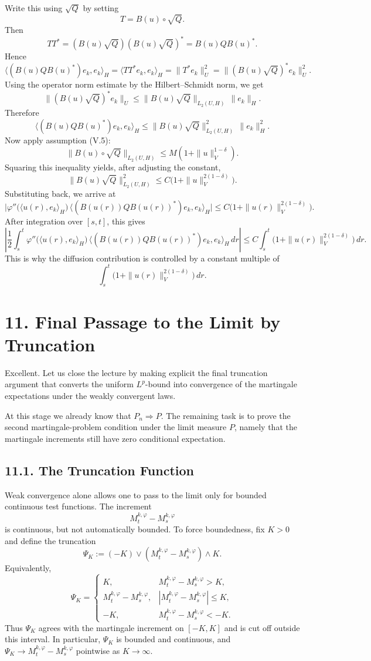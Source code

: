 \documentclass[11pt]{article}
\theoremstyle{definition}
\theoremstyle{remark}
\begin{document}
Write this using $\sqrt Q$ by setting
\[
  T=B(u)\circ \sqrt Q.
\]
Then
\[
  TT^*=(B(u)\sqrt Q)(B(u)\sqrt Q)^*=B(u)Q B(u)^*.
\]
Hence
\[
  \bigl\langle (B(u)Q B(u)^*)e_k,e_k\bigr\rangle_H
  =
  \langle TT^*e_k,e_k\rangle_H
  =
  \|T^*e_k\|_U^2
  =
  \|(B(u)\sqrt Q)^*e_k\|_U^2.
\]
Using the operator norm estimate by the Hilbert--Schmidt norm, we get
\[
  \|(B(u)\sqrt Q)^*e_k\|_U
  \le \|B(u)\sqrt Q\|_{L_2(U,H)}\,\|e_k\|_H.
\]
Therefore
\[
  \bigl\langle (B(u)Q B(u)^*)e_k,e_k\bigr\rangle_H
  \le \|B(u)\sqrt Q\|_{L_2(U,H)}^2\,\|e_k\|_H^2.
\]
Now apply assumption (V.5):
\[
  \|B(u)\circ \sqrt Q\|_{L_2(U,H)}
  \le M(1+\|u\|_V^{1-\delta}).
\]
Squaring this inequality yields, after adjusting the constant,
\[
  \|B(u)\sqrt Q\|_{L_2(U,H)}^2
  \le C\bigl(1+\|u\|_V^{2(1-\delta)}\bigr).
\]
Substituting back, we arrive at
\[
  \bigl|\varphi''\bigl(\langle u(r),e_k\rangle_H\bigr)\,
  \langle (B(u(r))Q B(u(r))^*)e_k,e_k\rangle_H\bigr|
  \le C\bigl(1+\|u(r)\|_V^{2(1-\delta)}\bigr).
\]
After integration over $[s,t]$, this gives
\[
  \left|
  \frac12\int_s^t \varphi''\bigl(\langle u(r),e_k\rangle_H\bigr)\,
  \langle (B(u(r))Q B(u(r))^*)e_k,e_k\rangle_H\,dr
  \right|
  \le C\int_s^t \bigl(1+\|u(r)\|_V^{2(1-\delta)}\bigr)\,dr.
\]
This is why the diffusion contribution is controlled by a constant multiple of
\[
  \int_s^t \bigl(1+\|u(r)\|_V^{2(1-\delta)}\bigr)\,dr.
\]

\section*{11. Final Passage to the Limit by Truncation}
Excellent. Let us close the lecture by making explicit the final truncation argument that converts the uniform $L^p$-bound into convergence of the martingale expectations under the weakly convergent laws.

At this stage we already know that $P_n\Rightarrow P$. The remaining task is to prove the second martingale-problem condition under the limit measure $P$, namely that the martingale increments still have zero conditional expectation.

\subsection*{11.1. The Truncation Function}
Weak convergence alone allows one to pass to the limit only for bounded continuous test functions. The increment
\[
  M_t^{k,\varphi}-M_s^{k,\varphi}
\]
is continuous, but not automatically bounded. To force boundedness, fix $K>0$ and define the truncation
\[
  \Psi_K:=(-K)\vee (M_t^{k,\varphi}-M_s^{k,\varphi})\wedge K.
\]
Equivalently,
\[
  \Psi_K=
  \begin{cases}
    K, & M_t^{k,\varphi}-M_s^{k,\varphi}>K,\\
    M_t^{k,\varphi}-M_s^{k,\varphi}, & |M_t^{k,\varphi}-M_s^{k,\varphi}|\le K,\\
    -K, & M_t^{k,\varphi}-M_s^{k,\varphi}<-K.
  \end{cases}
\]
Thus $\Psi_K$ agrees with the martingale increment on $[-K,K]$ and is cut off outside this interval. In particular, $\Psi_K$ is bounded and continuous, and $\Psi_K\to M_t^{k,\varphi}-M_s^{k,\varphi}$ pointwise as $K\to\infty$.
\end{document}
